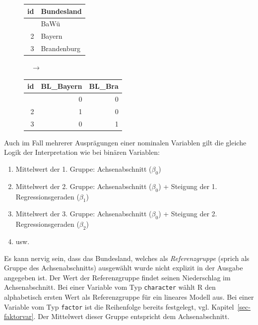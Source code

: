 \documentclass[
  letterpaper,
  twoside,
  open=any]{scrbook}
\providecommand{\tightlist}{%
  \setlength{\itemsep}{0pt}\setlength{\parskip}{0pt}}\usepackage{longtable,booktabs,array}
\theoremstyle{definition}
\theoremstyle{definition}
\theoremstyle{definition}
\theoremstyle{remark}
\begin{document}
\begin{figure}

\begin{minipage}{0.30\linewidth}

\begin{longtable}[]{@{}rl@{}}
\toprule\noalign{}
id & Bundesland \\
\midrule\noalign{}
\endhead
\bottomrule\noalign{}
\endlastfoot
1 & BaWü \\
2 & Bayern \\
3 & Brandenburg \\
\end{longtable}

\end{minipage}%
%
\begin{minipage}{0.10\linewidth}
\(\quad \rightarrow\)\end{minipage}%
%
\begin{minipage}{0.60\linewidth}

\begin{longtable}[]{@{}rrr@{}}
\toprule\noalign{}
id & BL\_Bayern & BL\_Bra \\
\midrule\noalign{}
\endhead
\bottomrule\noalign{}
\endlastfoot
1 & 0 & 0 \\
2 & 1 & 0 \\
3 & 0 & 1 \\
\end{longtable}

\end{minipage}%

\end{figure}%

Auch im Fall mehrerer Ausprägungen einer nominalen Variablen gilt die
gleiche Logik der Interpretation wie bei binären Variablen:

\begin{enumerate}
\def\labelenumi{\arabic{enumi}.}
\tightlist
\item
  Mittelwert der 1. Gruppe: Achsenabschnitt (\(\beta_0\))
\item
  Mittelwert der 2. Gruppe: Achsenabschnitt (\(\beta_0\)) + Steigung der
  1. Regressionsgeraden (\(\beta_1\))
\item
  Mittelwert der 3. Gruppe: Achsenabschnitt (\(\beta_0\)) + Steigung der
  2. Regressionsgeraden (\(\beta_2\))
\item
  usw.
\end{enumerate}

Es kann nervig sein, dass das Bundesland, welches als
\emph{Referenzgruppe} (sprich als Gruppe des Achsenabschnitts)
ausgewählt wurde nicht explizit in der Ausgabe angegeben ist. Der Wert
der Referenzgruppe findet seinen Niederschlag im Achsenabschnitt. Bei
einer Variable vom Typ \texttt{character} wählt R den alphabetisch
ersten Wert als Referenzgruppe für ein lineares Modell aus. Bei einer
Variable vom Typ \texttt{factor} ist die Reihenfolge bereits festgelegt,
vgl. Kapitel~\ref{sec-faktorvar}. Der Mittelwert dieser Gruppe
entspricht dem Achsenabschnitt.
\end{document}
